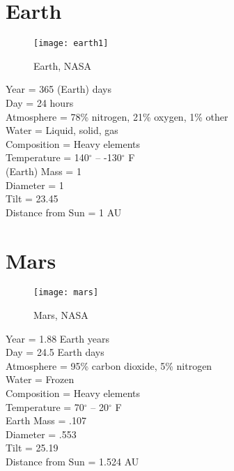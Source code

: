\documentclass[12pt]{book}
\begin{document}
\section{Earth}
 \begin{wrapfigure}{R}{0.4\textwidth}
         \vspace{-1cm}
        \begin{center}
        \texttt{[image: earth1]}\caption{\scriptsize Earth, NASA}
        \end{center}
         \vspace{-1cm}
    \end{wrapfigure}
Year = 365 (Earth) days\\
Day = 24 hours\\
Atmosphere = 78\% nitrogen, 21\% oxygen, 1\% other\\
Water = Liquid, solid, gas\\
Composition = Heavy elements\\
Temperature = 140$^{\circ}$ -- -130$^{\circ}$ F\\
(Earth) Mass = 1\\
Diameter = 1\\ 
Tilt = 23.45\\
Distance from Sun = 1 AU\\
\section{Mars}
 \begin{wrapfigure}{R}{0.4\textwidth}
         \vspace{-1cm}
        \begin{center}
        \texttt{[image: mars]}\caption{\scriptsize Mars, NASA}
        \end{center}
         \vspace{-1cm}
    \end{wrapfigure}
Year = 1.88 Earth years\\
Day = 24.5 Earth days\\
Atmosphere = 95\% carbon dioxide, 5\% nitrogen\\
Water = Frozen\\
Composition = Heavy elements\\
Temperature = 70$^{\circ}$ -- 20$^{\circ}$ F\\
Earth Mass = .107\\
Diameter = .553\\ 
Tilt = 25.19\\
Distance from Sun = 1.524 AU\\
\newpage
\end{document}
